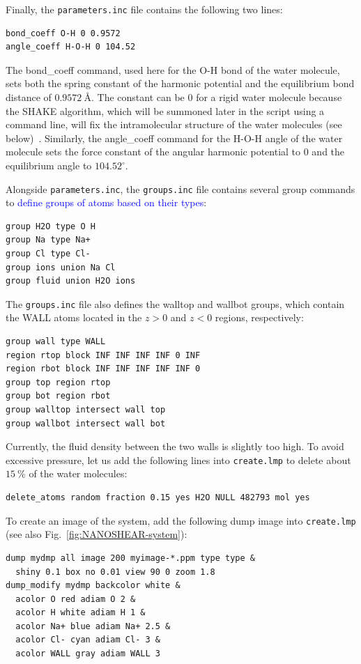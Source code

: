 \documentclass[9pt,tutorial]{livecoms}
\newcommand{\lmpcmd}[1]{\colorbox{listing}{\textcolor{command}{\small{#1}}}} %
\newcommand{\flecmd}[1]{\textcolor{command}{\texttt{#1}}} %
\begin{document}
Finally, the \flecmd{parameters.inc} file contains the following two lines:
\begin{lstlisting}
bond_coeff O-H 0 0.9572
angle_coeff H-O-H 0 104.52
\end{lstlisting}
The \lmpcmd{bond\_coeff} command, used here for the O-H bond of the water
molecule, sets both the spring constant of the harmonic potential and the
equilibrium bond distance of $0.9572~\text{\AA{}}$.  The constant can be 0 for a
rigid water molecule because the SHAKE algorithm, {\color{blue} which will be summoned
later in the script using a command line,} will {\color{blue} fix the intramolecular
structure} of the water {\color{blue} molecules} (see below)~\cite{ryckaert1977numerical, andersen1983rattle}.
Similarly, the \lmpcmd{angle\_coeff} command for the H-O-H angle of the water molecule sets
the force constant of the angular harmonic potential to 0 and the equilibrium
angle to $104.52^\circ$.

Alongside \flecmd{parameters.inc}, the \flecmd{groups.inc} file contains
several \lmpcmd{group} commands to \textcolor{blue}{define groups of atoms based
on their types}:
\begin{lstlisting}
group H2O type O H
group Na type Na+
group Cl type Cl-
group ions union Na Cl
group fluid union H2O ions
\end{lstlisting}
The \flecmd{groups.inc} file also defines the \lmpcmd{walltop} and \lmpcmd{wallbot}
groups, which contain the WALL atoms located in the $z > 0$ and $z < 0$ regions, respectively:
\begin{lstlisting}
group wall type WALL
region rtop block INF INF INF INF 0 INF
region rbot block INF INF INF INF INF 0
group top region rtop
group bot region rbot
group walltop intersect wall top
group wallbot intersect wall bot
\end{lstlisting}

Currently, the fluid density between the two walls is slightly too high.  To avoid
excessive pressure, let us add the following lines into \flecmd{create.lmp}
to delete about $15~\%$ of the water molecules:
\begin{lstlisting}
delete_atoms random fraction 0.15 yes H2O NULL 482793 mol yes
\end{lstlisting}

To create an image of the system, add the following \lmpcmd{dump} image
into \flecmd{create.lmp} (see also Fig.~\ref{fig:NANOSHEAR-system}):
\begin{lstlisting}
dump mydmp all image 200 myimage-*.ppm type type &
  shiny 0.1 box no 0.01 view 90 0 zoom 1.8
dump_modify mydmp backcolor white &
  acolor O red adiam O 2 &
  acolor H white adiam H 1 &
  acolor Na+ blue adiam Na+ 2.5 &
  acolor Cl- cyan adiam Cl- 3 &
  acolor WALL gray adiam WALL 3
\end{lstlisting}
\end{document}
